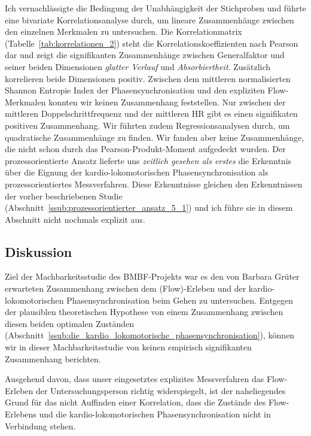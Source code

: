 Ich vernachlässigte die Bedingung der Unabhängigkeit der Stichproben und führte eine bivariate Korrelationsanalyse durch, um lineare Zusammenhänge zwischen den einzelnen Merkmalen zu untersuchen. Die Korrelationmatrix (Tabelle~\ref{tab:korrelationen_2}) steht die Korrelationskoeffizienten nach Pearson dar und zeigt die signifikanten Zusammenhänge zwischen Generalfaktor und seiner beiden Dimensionen \emph{glatter Verlauf} und \emph{Absorbiertheit}. Zusätzlich korrelieren beide Dimensionen positiv. Zwischen dem mittleren normalisierten Shannon Entropie Index der Phasensynchronisation und den expliziten Flow-Merkmalen konnten wir keinen Zusammenhang feststellen. Nur zwischen der mittleren Doppelschrittfrequenz und der mittleren HR gibt es einen signifikaten positiven Zusammenhang. Wir führten zudem Regressionsanalysen durch, um quadratische Zusammenhänge zu finden. Wir fanden aber keine Zusammenhänge, die nicht schon durch das Pearson-Produkt-Moment aufgedeckt wurden. Der prozessorientierte Ansatz lieferte uns \emph{zeitlich gesehen als erstes} die Erkenntnis über die Eignung der kardio-lokomotorischen Phasensynchronisation als prozessorientiertes Messverfahren. Diese Erkenntnisse gleichen den Erkenntnissen der vorher beschriebenen Studie (Abschnitt~\ref{ssub:prozessorientierter_ansatz_5_1}) und ich führe sie in diesem Abschnitt nicht nochmals explizit aus.

\subsection{Diskussion} 

\label{sub:diskussion_5_2}

Ziel der Machbarkeitsstudie des \acs{BMBF}-Projekts war es den von Barbara Grüter erwarteten Zusammenhang zwischen dem (Flow)-Erleben und der kardio-lokomotorischen Phasensynchronisation beim Gehen zu untersuchen. Entgegen der plausiblen theoretischen Hypothese von einem Zusammenhang zwischen diesen beiden optimalen Zuständen (Abschnitt~\ref{ssub:die_kardio_lokomotorische_phasensynchronisation}), können wir in dieser Machbarkeitsstudie von keinen empirisch signifikanten Zusammenhang berichten.

Ausgehend davon, dass unser eingesetztes explizites Messverfahren das Flow-Erleben der Untersuchungsperson richtig widerspiegelt, ist der naheliegendes Grund für das nicht Auffinden einer Korrelation, dass die Zustände des Flow-Erlebens und die kardio-lokomotorischen Phasensynchronisation nicht in Verbindung stehen.


